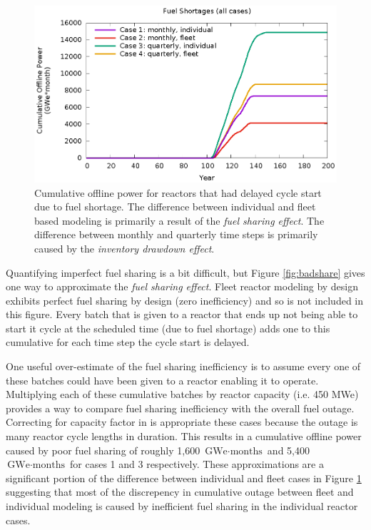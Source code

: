 \documentclass{style}
\begin{document}
\begin{figure}[!h]
    \centering
    \includegraphics[width=1.0\columnwidth]{exp2/unfueled.eps}
    \caption[Cumulative offline power due to fuel shortage]{
        Cumulative offline power for reactors that had delayed cycle start due
        to fuel shortage. The difference between individual and fleet based
        modeling is primarily a result of the \emph{fuel sharing effect}. The
        difference between monthly and quarterly time steps is primarily
        caused by the \emph{inventory drawdown effect}.
    }
    \label{fig:unfueled}
\end{figure}

Quantifying imperfect fuel sharing is a bit difficult, but Figure
\ref{fig:badshare} gives one way to approximate the \emph{fuel
sharing effect}.  Fleet reactor modeling by design exhibits perfect fuel
sharing by design (zero inefficiency) and so is not included in this figure.
Every batch that is given to a reactor that ends up not being able to start it
cycle at the scheduled time (due to fuel shortage) adds one to this cumulative
for each time step the cycle start is delayed.

One useful over-estimate of the fuel sharing inefficiency is to assume every
one of these batches could have been given to a reactor enabling it to
operate.  Multiplying each of these cumulative batches by reactor capacity
(i.e. 450 MWe) provides a way to compare fuel sharing inefficiency with the
overall fuel outage.  Correcting for capacity factor in is appropriate these
cases because the outage is many reactor cycle lengths in duration. This
results in a cumulative offline power caused by poor fuel sharing of roughly
1,600 $\text{GWe} \cdot \text{months}$ and 5,400 $\text{GWe} \cdot
\text{months}$ for cases 1 and 3 respectively.  These approximations are a
significant portion of the difference between individual and fleet cases in
Figure \ref{fig:unfueled} suggesting that most of the discrepency
in cumulative outage between fleet and individual modeling is caused by
inefficient fuel sharing in the individual reactor cases.
\end{document}
